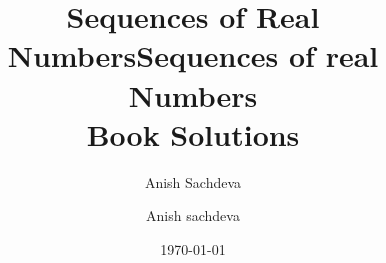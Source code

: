 \documentclass[11pt,letterpaper]{article}
\author{Anish Sachdeva}
\title{Sequences of Real Numbers}
\begin{document}
\title{Sequences of real Numbers\\
Book Solutions}
\author{Anish sachdeva}
\date{\today}
\maketitle

\end{document}
